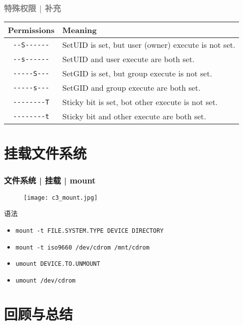 \begin{frame}[fragile]
  \frametitle{\textcolor{gray}{特殊权限 | 补充}}
  \begin{table}
    \centering
    \begin{tabular}{cl}
      \hline
      \rowcolor{blue!50} Permissions & Meaning\\
      \hline
      \verb|--S------| & SetUID is set, but user (owner) execute is not set.\\
      \verb|--s------| & SetUID and user execute are both set.\\
      \verb|-----S---| & SetGID is set, but group execute is not set.\\
      \verb|-----s---| & SetGID and group execute are both set.\\
      \verb|--------T| & Sticky bit is set, bot other execute is not set.\\
      \verb|--------t| & Sticky bit and other execute are both set.\\
      \hline
    \end{tabular}
  \end{table}
\end{frame}

\section{挂载文件系统}
\begin{frame}[fragile]
  \frametitle{文件系统 | 挂载 | mount }
  \begin{figure}
    \centering
    \texttt{[image: c3\_mount.jpg]}
  \end{figure}
  \pause
  \vspace{-0.3cm}
  \begin{block}{\alert{语法}}
    \begin{itemize}
      \item \verb|mount -t FILE.SYSTEM.TYPE DEVICE DIRECTORY|
      \item \verb|mount -t iso9660 /dev/cdrom /mnt/cdrom|
      \item \verb|umount DEVICE.TO.UNMOUNT|
      \item \verb|umount /dev/cdrom|
    \end{itemize}
  \end{block}
\end{frame}

\section{回顾与总结}
